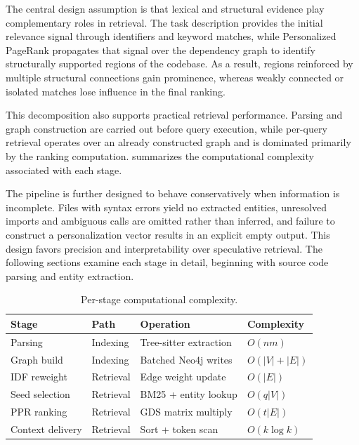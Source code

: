 The central design assumption is that lexical and structural evidence play complementary roles in retrieval. The task description provides the initial relevance signal through identifiers and keyword matches, while Personalized PageRank propagates that signal over the dependency graph to identify structurally supported regions of the codebase. As a result, regions reinforced by multiple structural connections gain prominence, whereas weakly connected or isolated matches lose influence in the final ranking.

This decomposition also supports practical retrieval performance. Parsing and graph construction are carried out before query execution, while per-query retrieval operates over an already constructed graph and is dominated primarily by the ranking computation.  summarizes the computational complexity associated with each stage.

The pipeline is further designed to behave conservatively when information is incomplete. Files with syntax errors yield no extracted entities, unresolved imports and ambiguous calls are omitted rather than inferred, and failure to construct a personalization vector results in an explicit empty output. This design favors precision and interpretability over speculative retrieval. The following sections examine each stage in detail, beginning with source code parsing and entity extraction.

\begin{table}[H]
    \centering
    \caption{Per-stage computational complexity.}
    \label{tab:stage-complexity}
    \cgtablerows
    \small
    \begin{tabularx}{\textwidth}{@{} 
        >{\RaggedRight\arraybackslash}p{3.1cm} 
        >{\centering\arraybackslash}p{1.65cm} 
        >{\RaggedRight\arraybackslash}X 
        >{\RaggedLeft\arraybackslash}p{2.2cm} @{}}
        \toprule
        \textbf{Stage} & \textbf{Path} & \textbf{Operation} & \textbf{Complexity} \\
        \midrule
        Parsing & Indexing & Tree-sitter extraction & $O(nm)$ \\
        Graph build & Indexing & Batched Neo4j writes & $O(|V|{+}|E|)$ \\
        IDF reweight & Retrieval & Edge weight update & $O(|E|)$ \\
        Seed selection & Retrieval & BM25 + entity lookup & $O(q|V|)$ \\
        PPR ranking & Retrieval & GDS matrix multiply & $O(t|E|)$ \\
        Context delivery & Retrieval & Sort + token scan & $O(k\log k)$ \\
        \bottomrule
    \end{tabularx}
    \noindent{}
\end{table}


